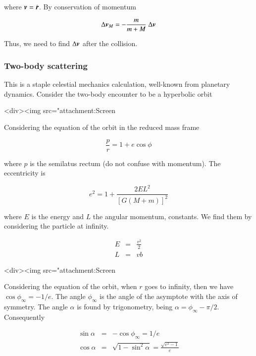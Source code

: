 where ${\boldsymbol{v}} = \dot{{\boldsymbol{r}}}$. By conservation of momentum   

\begin{equation}
\Delta \v{v}_M  = - \frac{m}{m+M} \ \Delta \v{v} 
\end{equation}

Thus, we need to find $\Delta{\boldsymbol{v}}$ after the collision.  


\subsubsection{Two-body scattering}

This is a staple celestial mechanics calculation, well-known from planetary dynamics. Consider the two-body encounter to be a hyperbolic orbit 

<div><img src="attachment:Screen%

Considering the equation of the orbit in the reduced mass frame


\begin{equation}
\frac{p}{r}  = 1 + e \cos\phi
\end{equation}

where $p$ is the semilatus rectum (do not confuse with momentum). The eccentricity is 

\begin{equation}
e^2 = 1 + \frac{2EL^2}{[G(M+m)]^2} 
\end{equation}

where $E$ is the energy and $L$ the angular momentum, constants. We find them by considering the particle at infinity. 


\begin{eqnarray}
E &=& \frac{v^2}{2}\\
L &=& vb
\end{eqnarray}


<div><img src="attachment:Screen%


Considering the equation of the orbit, when $r$ goes to infinity, then we have $\cos\phi_\infty = -1/e$. The angle $\phi_\infty$ is the angle of the asymptote with the axis of symmetry. The angle $\alpha$ is found by trigonometry, being $\alpha = \phi_\infty - \pi/2$. Consequently  

\begin{eqnarray}
\sin \alpha &=& -\cos\phi_\infty = 1/e\\
\cos \alpha &=& \sqrt{1-\sin^2\alpha} = \frac{\sqrt{e^2-1}}{e}
\end{eqnarray}

